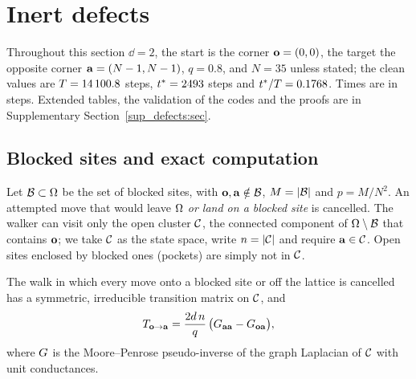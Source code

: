 \section{Inert defects}\label{s7_defects:sec}

Throughout this section $\dd=2$, the start is the corner $\mathbf{o}=(0,0)$, the target the opposite corner
$\mathbf{a}=(N-1,N-1)$, $q=0.8$, and $N=35$ unless stated; the clean values are $T=14\,100.8$ steps, $t^{*}=2493$ steps and
$t^{*}/T=0.1768$. Times are in steps. Extended tables, the validation of the codes and the proofs are in
Supplementary Section~\ref{sup_defects:sec}.

\subsection{Blocked sites and exact computation}\label{s7_defects_density:ssec-model}

Let $\mathcal{B}\subset\Omega$ be the set of blocked sites, with $\mathbf{o},\mathbf{a}\notin\mathcal{B}$, $M=|\mathcal{B}|$ and $p=M/N^{2}$. An attempted move
that would leave $\Omega$ \emph{or land on a blocked site} is cancelled. The walker can visit only the open cluster $\mathcal{C}$,
the connected component of $\Omega\setminus\mathcal{B}$ that contains $\mathbf{o}$; we take $\mathcal{C}$ as the state space, write $n=|\mathcal{C}|$
and require $\mathbf{a}\in\mathcal{C}$. Open sites enclosed by blocked ones (pockets) are simply not in $\mathcal{C}$.

\begin{proposition}\label{s7_defects_density:prop-resistance}
The walk in which every move onto a blocked site or off the lattice is cancelled has a symmetric, irreducible
transition matrix on $\mathcal{C}$, and
\begin{equation}\label{s7_defects_density:eq-resistance}
  T_{\mathbf{o}\to\mathbf{a}}=\frac{2d\,n}{q}\,\bigl(G_{\mathbf{a}\mathbf{a}}-G_{\mathbf{o}\mathbf{a}}\bigr),
\end{equation}
where $G$ is the Moore--Penrose pseudo-inverse of the graph Laplacian of $\mathcal{C}$ with unit conductances.
\end{proposition}

